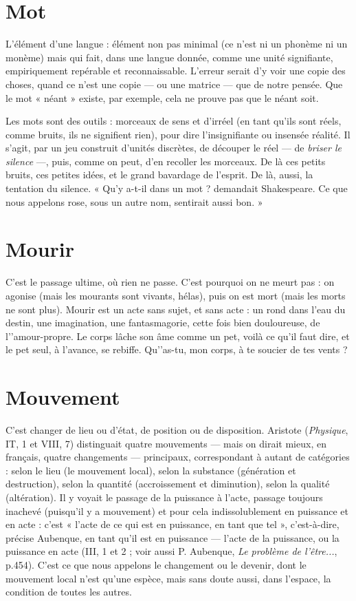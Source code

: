 \section{Mot}
L'élément d’une langue : élément non pas minimal (ce n’est ni un
phonème ni un monème) mais qui fait, dans une langue donnée,
comme une unité signifiante, empiriquement repérable et reconnaissable.
L'erreur serait d’y voir une copie des choses, quand ce n’est une copie — ou une
matrice — que de notre pensée. Que le mot « néant » existe, par exemple, cela
ne prouve pas que le néant soit.

Les mots sont des outils : morceaux de sens et d’irréel (en tant qu’ils sont
réels, comme bruits, ils ne signifient rien), pour dire l’insignifiante ou insensée
réalité. Il s’agit, par un jeu construit d’unités discrètes, de découper le réel — de
{\it briser le silence} —, puis, comme on peut, d’en recoller les morceaux. De là ces
petits bruits, ces petites idées, et le grand bavardage de l'esprit. De là, aussi,
la tentation du silence. « Qu’y a-t-il dans un mot ? demandait Shakespeare. Ce
que nous appelons rose, sous un autre nom, sentirait aussi bon. »

\section{Mourir}
C'est le passage ultime, où rien ne passe. C’est pourquoi on ne
meurt pas : on agonise (mais les mourants sont vivants, hélas),
puis on est mort (mais les morts ne sont plus). Mourir est un acte sans sujet, et
sans acte : un rond dans l’eau du destin, une imagination, une fantasmagorie,
cette fois bien douloureuse, de l’'amour-propre. Le corps lâche son âme comme
un pet, voilà ce qu'il faut dire, et le pet seul, à l’avance, se rebiffe. Qu'’as-tu,
mon corps, à te soucier de tes vents ?

\section{Mouvement}
C'est changer de lieu ou d’état, de position ou de disposition.
Aristote ({\it Physique}, IT, 1 et VIII, 7) distinguait quatre mouvements — mais
on dirait mieux, en français, quatre changements — principaux, correspondant
à autant de catégories : selon le lieu (le mouvement local), selon la substance
(génération et destruction), selon la quantité (accroissement et diminution),
selon la qualité (altération). Il y voyait le passage de la puissance à l’acte, passage
toujours inachevé (puisqu'il y a mouvement) et pour cela indissolublement
en puissance et en acte : c’est « l’acte de ce qui est en puissance, en tant
que tel », c’est-à-dire, précise Aubenque, en tant qu’il est en puissance — l’acte
de la puissance, ou la puissance en acte (III, 1 et 2 ; voir aussi P. Aubenque, {\it Le
problème de l'être...}, p.454). C’est ce que nous appelons le changement ou le
devenir, dont le mouvement local n’est qu’une espèce, mais sans doute aussi,
dans l’espace, la condition de toutes les autres.

